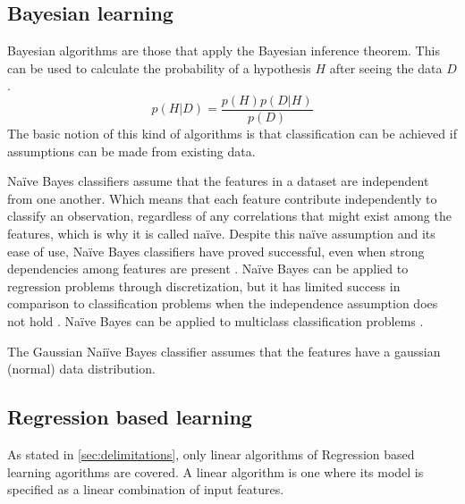 	
	\subsection{Bayesian learning}
		Bayesian algorithms are those that apply the Bayesian inference theorem. This can be used to calculate the probability of a hypothesis $H$ after seeing the data $D$.
		\begin{equation} \label{eq:bayes}
			p(H|D) = \frac{p(H)p(D|H)}{p(D)}
		\end{equation} 
	The basic notion of this kind of algorithms is that classification can be achieved if assumptions can be made from existing data. %

	Naïve Bayes classifiers assume that the features in a dataset are independent from one another. Which means that each feature contribute independently to classify an observation, regardless of any correlations that might exist among the features, which is why it is called naïve. Despite this naïve assumption and its ease of use, Naïve Bayes classifiers have proved successful, even when strong dependencies among features are present \cite{ARTICLE:13, IP:4}. Naïve Bayes can be applied to regression problems through discretization, but it has limited success in comparison to classification problems when the independence assumption does not hold \cite{ARTICLE:14}. Naïve Bayes can be applied to multiclass classification problems \cite{ARTICLE:17}. 

	The Gaussian Naiïve Bayes classifier assumes that the features have a gaussian (normal) data distribution.
	 
	\subsection{Regression based learning} \label{sec:reg_based_learning}
		As stated in \ref{sec:delimitations}, only linear algorithms of Regression based learning agorithms are covered. A linear algorithm is one where its model is specified as a linear combination of input features.  

